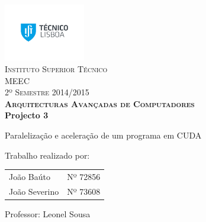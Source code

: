 \begin{titlepage}
	
	\begin{center}
		
		\includegraphics[trim = 4cm 4cm 4cm 4cm, keepaspectratio=true, height=2.5cm]{IST_LOGO.pdf}~\\[0.5cm]
		
		\textsc{\LARGE Instituto Superior Técnico\\[0.5cm]
		               MEEC\\[0.5cm]
		               2º Semestre 2014/2015\\[2cm]
		               \huge \bfseries Arquitecturas Avançadas de Computadores}\\[3cm]
		
		
		\huge \bfseries Projecto 3\\[0.5cm]
		\vfill
		\large
		
		Paralelização e aceleração de um programa em CUDA \\[0.5cm]
		\vfill
		
		Trabalho realizado por:\\
		\begin{tabular}{l r}
			João Baúto & Nº 72856\\
			João Severino &  Nº 73608\\
		\end{tabular}
		\vfill
		{\large 
			Professor: Leonel Sousa
			}
	\end{center}
	
	\cleardoublepage
	\setcounter{page}{1}
\end{titlepage}
